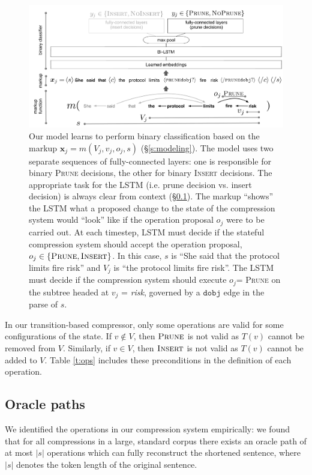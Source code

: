 \documentclass[11pt,a4paper]{article}
\begin{document}
\begin{figure}[htb!]
\centering
\includegraphics[width=.85\textwidth]{example.pdf}
\caption{Our model learns to perform binary classification based on the markup $\bm{x}_j=m(V_j,v_j,o_j,s)$ (\S\ref{s:modeling}). The model uses two separate sequences of fully-connected layers: one is responsible for binary \textsc{Prune} decisions, the other for binary \textsc{Insert} decisions. The appropriate task for the LSTM (i.e. prune decision vs. insert decision) is always clear from context (\S\ref{s:oracle}). The markup ``shows'' the LSTM what a proposed change to the state of the compression system would ``look'' like if the operation proposal $o_j$ were to be carried out. At each timestep, LSTM must decide if the stateful compression system should accept the operation proposal, $o_j \in \{\textsc{Prune}, \textsc{Insert}\}$. In this case, $s$ is ``She said that the protocol limits fire risk'' and $V_j$ is ``the protocol limits fire risk''.  The LSTM must decide if the compression system should execute $o_j$= \textsc{Prune} on the subtree headed at $v_j$ = \textit{risk}, governed by a $\texttt{dobj}$ edge in the parse of $s$. }
\label{f:example}
\end{figure}

In our transition-based compressor, only some operations are valid for some configurations of the state. If $v \notin V$, then $\textsc{Prune}$ is not valid as $T(v)$ cannot be removed from $V$. Similarly, if $v \in V$, then $\textsc{Insert}$ is not valid as $T(v)$ cannot be added to $V$. Table \ref{t:ops} includes these preconditions in the definition of each operation.

\subsection{Oracle paths}\label{s:oracle}

We identified the operations in our compression system empirically: we found that for all compressions in a large, standard corpus \cite{filippova2013overcoming} there exists an oracle path of at most $|s|$ operations which can fully reconstruct the shortened sentence, where $|s|$ denotes the token length of the original sentence.
\end{document}
